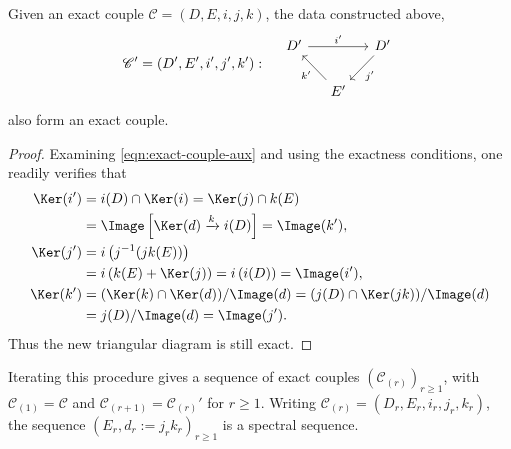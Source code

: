 \begin{lemma}
	Given an exact couple $\mathscr{C}=(D,E,i,j,k)$, the data constructed above,
	\[ \mathscr{C}'=(D',E',i',j',k'):\quad
	\begin{tikzcd}[column sep=small]
		D' \arrow[rr, "{i'}"] & & D' \arrow[ld, "{j'}"] \\
		& E' \arrow[lu, "{k'}"] &
	\end{tikzcd} \]
	also form an exact couple.
\end{lemma}
\begin{proof}
	Examining \eqref{eqn:exact-couple-aux} and using the exactness conditions,
	one readily verifies that
	\begin{align*}
		\Ker(i') &= i(D)\cap\Ker(i)=\Ker(j)\cap k(E) \\
		&=\Image\left[\Ker(d)\xrightarrow{k}i(D)\right]=\Image(k'), \\
		\Ker(j') &= i\left(j^{-1}(jk(E))\right) \\
		&=i\left(k(E)+\Ker(j)\right)=i\left(i(D)\right)=\Image(i'), \\
		\Ker(k') &= (\Ker(k)\cap\Ker(d))/\Image(d)
		=(j(D)\cap\Ker(jk))/\Image(d) \\
		&=j(D)/\Image(d)=\Image(j').
	\end{align*}
	Thus the new triangular diagram is still exact.
\end{proof}

Iterating this procedure gives a sequence of exact couples
$(\mathscr{C}_{(r)})_{r\geq1}$, with
$\mathscr{C}_{(1)}=\mathscr{C}$ and
$\mathscr{C}_{(r+1)}=\mathscr{C}_{(r)}'$ for $r\geq1$. Writing
$\mathscr{C}_{(r)}=(D_r,E_r,i_r,j_r,k_r)$, the sequence
$(E_r,d_r:=j_rk_r)_{r\geq1}$ is a spectral sequence.

